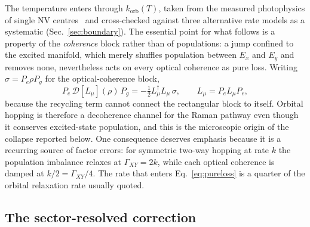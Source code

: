 \documentclass[
  reprint,
  amsmath,amssymb,
  aps,pra,
  superscriptaddress,
  floatfix,
]{revtex4-2}
\newcommand{\Gxy}{\Gamma_{XY}}
\begin{document}
The temperature enters through $k_{\mathrm{orb}}(T)$, taken from the
measured photophysics of single NV centres~\cite{J2023S06} and cross-checked
against three alternative rate models as a systematic
(Sec.~\ref{sec:boundary}). The essential point for what follows is a property
of the \emph{coherence} block rather than of populations: a jump confined to
the excited manifold, which merely shuffles population between $E_{x}$ and
$E_{y}$ and removes none, nevertheless acts on every optical coherence as
pure loss. Writing $\sigma=P_{e}\rho P_{g}$ for the optical-coherence block,
%
\begin{equation}
P_{e}\,\mathcal{D}[L_{\mu}](\rho)\,P_{g}
=-\tfrac12 L_{\mu}^{\dagger}L_{\mu}\,\sigma ,
\qquad L_{\mu}=P_{e}L_{\mu}P_{e},
\label{eq:pureloss}
\end{equation}
%
because the recycling term cannot connect the rectangular block to itself.
Orbital hopping is therefore a decoherence channel for the Raman pathway even
though it conserves excited-state population, and this is the microscopic
origin of the collapse reported below. One consequence deserves emphasis
because it is a recurring source of factor errors: for symmetric two-way
hopping at rate $k$ the population imbalance relaxes at
$\Gxy=2k$, while each optical coherence is damped at $k/2=\Gxy/4$. The rate
that enters Eq.~\eqref{eq:pureloss} is a quarter of the orbital relaxation
rate usually quoted.

\subsection{The sector-resolved correction}
\end{document}
